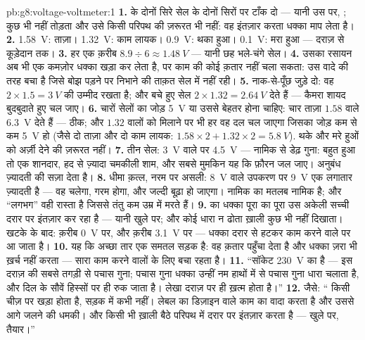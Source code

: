\begin{solution}{pb:g8:voltage-voltmeter:1}
\textbf{1.}  के दोनों सिरे सेल के दोनों सिरों पर टाँक दो ---
यानी उस पर, ;  कुछ भी नहीं तोड़ता और उसे किसी परिपथ
की ज़रूरत भी नहीं: वह इंतज़ार करता धक्का माप लेता है।
\textbf{2.} \qty{1.58}{V}: ताज़ा। \qty{1.32}{V}: काम लायक।
\qty{0.9}{V}: थका हुआ। \qty{0.1}{V}: मरा हुआ --- दराज़ से कूड़ेदान
तक।
\textbf{3.} हर एक क़रीब $8.9 \div 6 \approx \qty{1.48}{V}$ ---
यानी छह भले-चंगे सेल।
\textbf{4.} उसका रसायन अब भी एक कमज़ोर धक्का खड़ा कर लेता है, पर काम
की कोई क़तार नहीं चला सकता:  उस वादे की तरह बचा है जिसे बोझ
पड़ने पर निभाने की ताक़त सेल में नहीं रही।
\textbf{5.} नाक-से-पूँछ जुड़े दो: वह $2 \times 1.5 = \qty{3}{V}$ की
उम्मीद रखता है; और बचे हुए सेल $2 \times 1.32 = \qty{2.64}{V}$ देते
हैं --- कैमरा शायद बुदबुदाते हुए चल जाए।
\textbf{6.} चारों सेलों का जोड़ \qty{5}{V} या उससे बेहतर होना चाहिए:
चार ताज़ा $1.58$ वाले \qty{6.3}{V} देते हैं --- ठीक; और $1.32$ वालों
को मिलाने पर भी हर वह दल चल जाएगा जिसका जोड़ कम से कम \qty{5}{V} हो
(जैसे दो ताज़ा और दो काम लायक: $1.58 \times 2 + 1.32 \times 2 =
\qty{5.8}{V}$). थके और मरे हुओं को अर्ज़ी देने की ज़रूरत नहीं।
\textbf{7.} तीन सेल: \qty{3}{V} वाले  पर \qty{4.5}{V} ---
नामिक से डेढ़ गुना: बहुत हुआ तो एक शानदार, हद से ज़्यादा चमकीली शाम,
और सबसे मुमकिन यह कि फ़ौरन जल जाए। अनुबंध ज़्यादती की सज़ा देता है।
\textbf{8.} धीमा क़त्ल, नरम पर असली: \qty{8}{V} वाले उपकरण पर
\qty{9}{V} एक लगातार ज़्यादती है --- वह चलेगा, गरम होगा, और जल्दी
बूढ़ा हो जाएगा। नामिक का मतलब नामिक है; और ``लगभग'' वही रास्ता है
जिससे तंतु कम उम्र में मरते हैं।
\textbf{9.}  का धक्का पूरा का पूरा उस अकेली सच्ची दरार पर
इंतज़ार कर रहा है --- यानी खुले  पर; और कोई धारा न ढोता ख़ाली
 कुछ भी नहीं दिखाता। खटके के बाद:  क़रीब \qty{0}{V} पर, और
 क़रीब \qty{3.1}{V} पर --- धक्का दरार से हटकर काम करने वाले पर आ
जाता है।
\textbf{10.} यह कि अच्छा तार एक समतल सड़क है: वह क़तार पहुँचा देता है
और धक्का ज़रा भी ख़र्च नहीं करता --- सारा  काम करने वालों के
लिए बचा रहता है।
\textbf{11.} ``सॉकेट \qty{230}{V} का है --- इस दराज़ की सबसे
तगड़ी  से पचास गुना; पचास गुना धक्का उन्हीं नम हाथों में से पचास
गुना धारा चलाता है, और दिल  के सौवें हिस्सों पर ही रुक जाता है।
लेखा दराज़ पर ही ख़त्म होता है।''
\textbf{12.} जैसे: `` किसी चीज़ पर खड़ा होता है, सड़क में
कभी नहीं। लेबल का  डिज़ाइन वाले काम का वादा करता है और
उससे आगे जलने की धमकी। और किसी भी ख़ाली बैठे परिपथ में  दरार
पर इंतज़ार करता है --- खुले  पर, तैयार।''
\end{solution}
